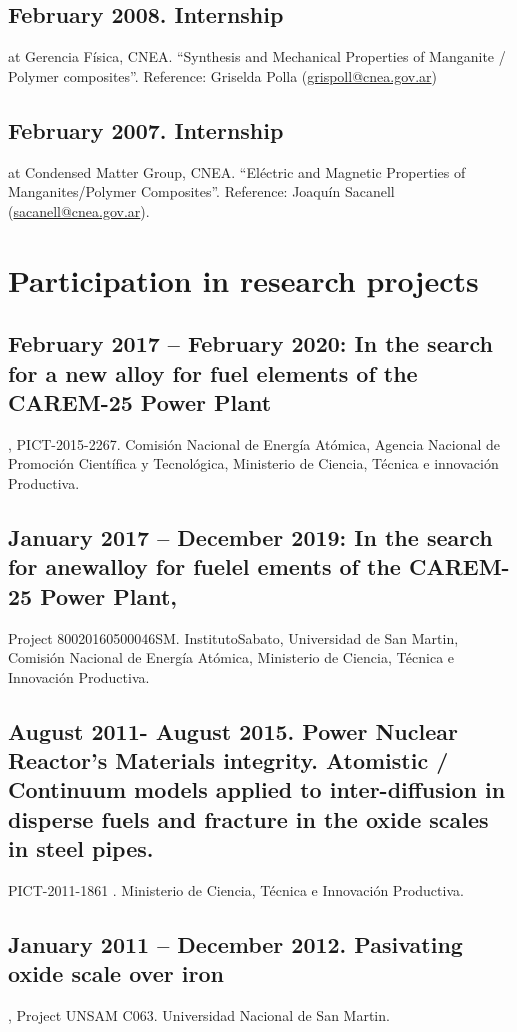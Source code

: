 \documentclass{my_cv}
\begin{document}
\subsection{February 2008. Internship }at Gerencia Física, CNEA. “Synthesis and Mechanical Properties of Manganite / Polymer composites”. Reference: Griselda Polla (\url{grispoll@cnea.gov.ar})

\subsection{February 2007. Internship} at Condensed Matter Group, CNEA. “Eléctric and Magnetic Properties of Manganites/Polymer Composites”. Reference: Joaquín Sacanell (\url{sacanell@cnea.gov.ar}). 

\section{Participation in research projects}

\subsection{February 2017 – February 2020: In the search for a new alloy for fuel elements of the CAREM-25 Power Plant}, PICT-2015-2267. Comisión Nacional de Energía Atómica, Agencia Nacional de Promoción Científica y Tecnológica, Ministerio de Ciencia, Técnica e innovación Productiva.

\subsection{January 2017 – December 2019: In the search for anewalloy for fuelel ements of the CAREM-25 Power Plant, }Project 80020160500046SM. InstitutoSabato, Universidad de San Martin, Comisión Nacional de Energía Atómica, Ministerio de Ciencia, Técnica e Innovación Productiva.

\subsection{August 2011- August 2015. Power Nuclear Reactor’s Materials integrity. Atomistic / Continuum models applied to inter-diffusion in disperse fuels and fracture in the oxide scales in steel pipes.} PICT-2011-1861 . Ministerio de Ciencia, Técnica e Innovación Productiva. 

\subsection{January 2011 – December 2012. Pasivating oxide scale over iron}, Project UNSAM C063. Universidad Nacional de San Martin. 
\end{document}
